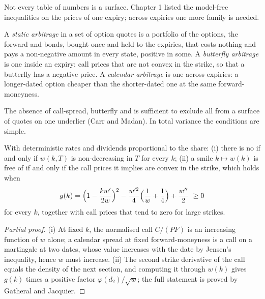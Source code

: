 Not every table of numbers is a surface. Chapter 1 listed the model-free inequalities on
the prices of one expiry; across expiries one more family is needed.

\begin{definition}\label{def:dv:implied-volatility-and-its-surface:static}
A \emph{static arbitrage} in a set of option quotes is a portfolio
of the options, the forward and bonds, bought once and held to the expiries, that costs
nothing and pays a non-negative amount in every state, positive in some. A
\emph{butterfly arbitrage} is one inside an expiry: call prices
that are not convex in the strike, so that a butterfly has a negative price. A
\emph{calendar arbitrage} is one across expiries: a longer-dated
option cheaper than the shorter-dated one at the same forward-moneyness.
\end{definition}

The absence of call-spread, butterfly and  is sufficient to exclude all
 from a surface of quotes on one underlier (Carr and Madan). In total
variance the conditions are simple.

\begin{proposition}\label{prop:dv:implied-volatility-and-its-surface:static}
With deterministic rates and dividends proportional to the share: (i) there is no  if and only if $w(k,T)$ is non-decreasing in $T$ for every $k$; (ii) a smile
$k\mapsto w(k)$ is free of  if and only if the call prices it implies
are convex in the strike, which holds when
\[
g(k)=\Bigl(1-\frac{kw'}{2w}\Bigr)^2-\frac{w'^2}{4}\Bigl(\frac1w+\frac14\Bigr)+\frac{w^{\prime\prime}}{2}\ \ge0
\]
for every $k$, together with call prices that tend to zero for large strikes.
\end{proposition}
\begin{proof}[Partial proof]
(i) At fixed $k$, the normalised call $C/(PF)$ is an increasing function of $w$ alone; a
calendar spread at fixed forward-moneyness is a call on a martingale at two dates, whose
value increases with the date by Jensen's inequality, hence $w$ must increase. (ii) The
second strike derivative of the call equals the density of the next section, and computing
it through $w(k)$ gives $g(k)$ times a positive factor $\varphi(d_2)/\sqrt w$; the full
statement is proved by Gatheral and Jacquier.
\end{proof}

